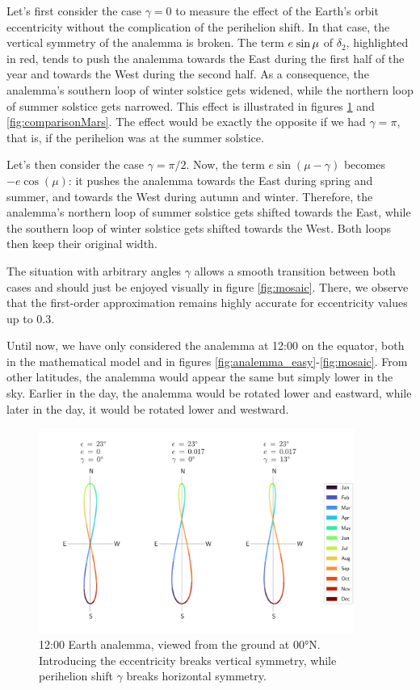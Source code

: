 \documentclass[12pt]{article}
\newcommand{\Sin}{%
  \mathop{\sbox0{$\cos$}\makebox[\wd0][r]{$\sin$}}%
}
\begin{document}
Let's first consider the case $\gamma=0$ to measure the effect of the 
Earth's orbit eccentricity without the complication of the perihelion shift.
In that case, the vertical symmetry of the analemma is broken. The term 
$e\Sin\mu$ of $\delta_2$, highlighted in red, tends to push the 
analemma towards the East during the first half of the year and towards the 
West during the second half. 
As a consequence, the analemma's southern loop of winter solstice gets widened, 
while the northern loop of summer solstice gets narrowed. 
This effect is illustrated in figures 
\ref{fig:comparisonEarth} and \ref{fig:comparisonMars}.
The effect would be exactly the opposite if we had $\gamma=\pi$,
that is, if the perihelion was at the summer solstice.

Let's then consider the case $\gamma=\pi/2$. Now, the term $e\sin(\mu-\gamma)$
becomes $-e\cos(\mu)$: it pushes the analemma towards the East during spring 
and summer, and towards the West during autumn and winter.
Therefore, the analemma's northern loop of summer solstice gets shifted
towards the East, while the southern loop of winter solstice gets shifted
towards the West. Both loops then keep their original width.

The situation with arbitrary angles $\gamma$ allows a smooth transition 
between both cases and should just be enjoyed visually in figure \ref{fig:mosaic}. 
There, we observe that the first-order approximation remains highly accurate 
for eccentricity values up to $0.3$.

Until now, we have only considered the analemma at 12:00 on the equator, both
in the mathematical model and in figures \ref{fig:analemma_easy}-\ref{fig:mosaic}. From other latitudes, the 
analemma would appear the same but simply lower in the sky. Earlier in 
the day, the analemma would be rotated lower and eastward, 
while later in the day, it would be rotated lower and westward.

\begin{figure}
    \centering
    \includegraphics[width=0.92\textwidth]{./comparisonEarth.pdf}
    \caption{
        12:00 Earth analemma, viewed from the ground at 00°N. Introducing the 
        eccentricity breaks vertical symmetry, while perihelion shift 
        $\gamma$ breaks horizontal symmetry.
    }
    \label{fig:comparisonEarth}
\end{figure}
\end{document}
